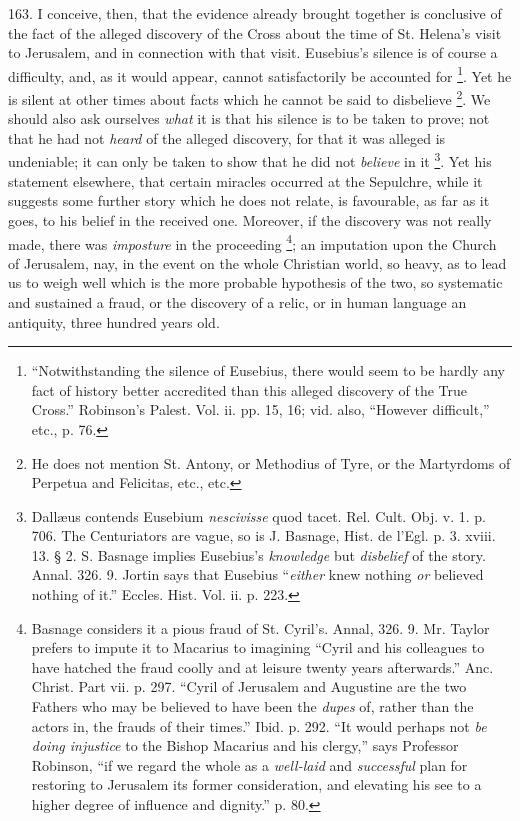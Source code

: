 163.
I conceive, then, that the evidence already brought together is
conclusive of the fact of the alleged discovery of the Cross about the
time of St. Helena's visit to Jerusalem, and in connection with that
visit. Eusebius's silence is of course a difficulty, and, as it would
appear, cannot satisfactorily be accounted for \footnote{``Notwithstanding the silence of Eusebius, there would seem to be
hardly any fact of history better accredited than this alleged
discovery of the True Cross.'' Robinson's Palest. Vol. ii. pp. 15, 16;
vid. also, ``However difficult,'' etc., p. 76.}. Yet he is silent at other times about facts which he
cannot be said to disbelieve \footnote{He does not mention St. Antony, or Methodius of Tyre, or the
Martyrdoms of Perpetua and Felicitas, etc., etc.}. We should also ask ourselves \emph{what} it is that his
silence is to be taken to prove; not that he had not \emph{heard} of
the alleged discovery, for that it was alleged is undeniable; it can
only be taken to show that he did not \emph{believe} in it \footnote{Dallæus contends Eusebium \emph{nescivisse} quod tacet. Rel. Cult.
Obj. v. 1. p. 706. The Centuriators are vague, so is J. Basnage, Hist.
de l'Egl. p. 3. xviii. 13. § 2. S. Basnage implies Eusebius's \emph{knowledge}
but \emph{disbelief} of the story. Annal. 326. 9. Jortin says that
Eusebius ``\emph{either} knew nothing \emph{or} believed nothing of it.''
Eccles. Hist. Vol. ii. p. 223.}. Yet his statement elsewhere, that certain miracles occurred
at the Sepulchre, while it suggests some further story which he does
not relate, is favourable, as far as it goes, to his belief in the
received one. Moreover, if the discovery was not really made, there
was \emph{imposture} in the proceeding \footnote{Basnage considers it a pious fraud of St. Cyril's. Annal, 326. 9. Mr.
Taylor prefers to impute it to Macarius to imagining ``Cyril and his
colleagues to have hatched the fraud coolly and at leisure twenty
years afterwards.'' Anc. Christ. Part vii. p. 297. ``Cyril of Jerusalem
and Augustine are the two Fathers who may be believed to have been the
\emph{dupes} of, rather than the actors in, the frauds of their times.''
Ibid. p. 292. ``It would perhaps not \emph{be doing injustice} to the
Bishop Macarius and his clergy,'' says Professor Robinson, ``if we
regard the whole as a \emph{well-laid} and \emph{successful} plan for
restoring to Jerusalem its former consideration, and elevating his see
to a higher degree of influence and dignity.'' p. 80.}; an imputation upon the Church of Jerusalem, nay, in the event
on the whole Christian world, so heavy, as to lead us to weigh
well which is the more probable hypothesis of the two, so systematic
and sustained a fraud, or the discovery of a relic, or in human
language an antiquity, three hundred years old.

